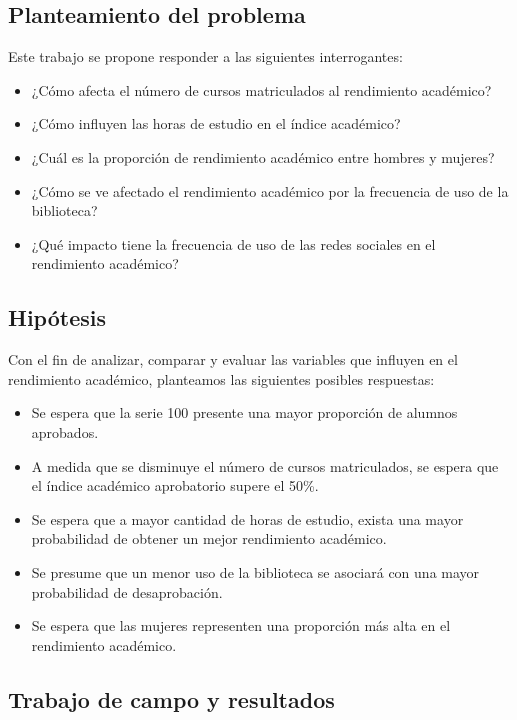 \documentclass[
  a4paper,
]{article}
\providecommand{\tightlist}{%
  \setlength{\itemsep}{0pt}\setlength{\parskip}{0pt}}\usepackage{longtable,booktabs,array}
\begin{document}
\subsection{Planteamiento del
problema}\label{planteamiento-del-problema}

Este trabajo se propone responder a las siguientes interrogantes:

\begin{itemize}
\tightlist
\item
  ¿Cómo afecta el número de cursos matriculados al rendimiento
  académico?
\item
  ¿Cómo influyen las horas de estudio en el índice académico?
\item
  ¿Cuál es la proporción de rendimiento académico entre hombres y
  mujeres?
\item
  ¿Cómo se ve afectado el rendimiento académico por la frecuencia de uso
  de la biblioteca?
\item
  ¿Qué impacto tiene la frecuencia de uso de las redes sociales en el
  rendimiento académico?
\end{itemize}

\subsection{Hipótesis}\label{hipuxf3tesis}

Con el fin de analizar, comparar y evaluar las variables que influyen en
el rendimiento académico, planteamos las siguientes posibles respuestas:

\begin{itemize}
\tightlist
\item
  Se espera que la serie 100 presente una mayor proporción de alumnos
  aprobados.
\item
  A medida que se disminuye el número de cursos matriculados, se espera
  que el índice académico aprobatorio supere el 50\%.
\item
  Se espera que a mayor cantidad de horas de estudio, exista una mayor
  probabilidad de obtener un mejor rendimiento académico.
\item
  Se presume que un menor uso de la biblioteca se asociará con una mayor
  probabilidad de desaprobación.
\item
  Se espera que las mujeres representen una proporción más alta en el
  rendimiento académico.
\end{itemize}

\subsection{Trabajo de campo y
resultados}\label{trabajo-de-campo-y-resultados}
\end{document}
